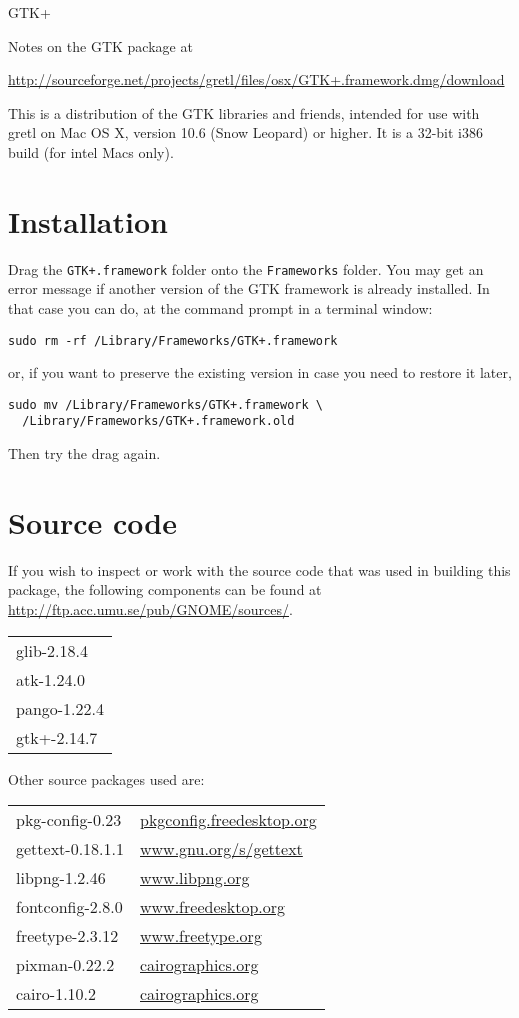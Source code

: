 \documentclass[11pt]{article}
\begin{document}
\thispagestyle{empty}

\begin{center}
{\color{gold} \gtkfont GTK+}
\end{center}

Notes on the GTK package at

\url{http://sourceforge.net/projects/gretl/files/osx/GTK+.framework.dmg/download}

This is a distribution of the GTK libraries and friends, intended for
use with gretl on Mac OS X, version 10.6 (Snow Leopard) or higher.
It is a 32-bit i386 build (for intel Macs only).

\section{Installation}

Drag the \texttt{GTK+.framework} folder onto the \texttt{Frameworks}
folder. You may get an error message if another version of the GTK
framework is already installed. In that case you can do, at the
command prompt in a terminal window:

\verb|sudo rm -rf /Library/Frameworks/GTK+.framework|

or, if you want to preserve the existing version in case you need to
restore it later,
\begin{verbatim}
sudo mv /Library/Frameworks/GTK+.framework \
  /Library/Frameworks/GTK+.framework.old
\end{verbatim}

Then try the drag again.

\section{Source code}

If you wish to inspect or work with the source code that was used in
building this package, the following components can be found at
\url{http://ftp.acc.umu.se/pub/GNOME/sources/}.

\begin{tabular}{l}
glib-2.18.4 \\
atk-1.24.0 \\
pango-1.22.4 \\
gtk+-2.14.7 \\
\end{tabular}

Other source packages used are:

\begin{tabular}{ll}
pkg-config-0.23 & \url{pkgconfig.freedesktop.org} \\
gettext-0.18.1.1 & \url{www.gnu.org/s/gettext} \\
libpng-1.2.46 & \url{www.libpng.org} \\
fontconfig-2.8.0 & \url{www.freedesktop.org} \\
freetype-2.3.12 & \url{www.freetype.org} \\
pixman-0.22.2 & \url{cairographics.org} \\
cairo-1.10.2 & \url{cairographics.org} \\
\end{tabular}
\end{document}
